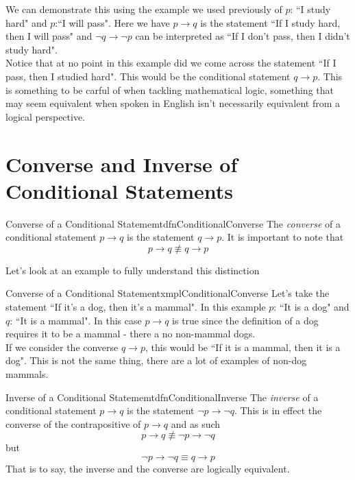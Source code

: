We can demonstrate this using the example we used previously of $p$: ``I study hard" and $p$:``I will pass". Here we have $p \to q$ is the statement ``If I study hard, then I will pass" and $\lnot q \to \lnot p$ can be interpreted as ``If I don't pass, then I didn't study hard".\\

Notice that at no point in this example did we come across the statement ``If I pass, then I studied hard". This would be the conditional statement $q \to p$. This is something to be carful of when tackling mathematical logic, something that may seem equivalent when spoken in English isn't necessarily equivalent from a logical perspective.

\section{Converse and Inverse of Conditional Statements}

\begin{dfn}[label={def:conditionalConverse}]{Converse of a Conditional Statememt}{dfnConditionalConverse}
    The \emph{converse} of a conditional statement $p \to q$ is the statement $q \to p$. It is important to note that
    $$p \to q \not \equiv q \to p$$
\end{dfn}

Let's look at an example to fully understand this distinction

\begin{exmpl}[label={exmpl:conditionalConverse}]{Converse of a Conditional Statement}{xmplConditionalConverse}
    Let's take the statement ``If it's a dog, then it's a mammal". In this example $p$: ``It is a dog" and $q$: ``It is a mammal". In this case $p \to q$ is true since the definition of a dog requires it to be a mammal - there a no non-mammal dogs.\\

    If we consider the converse $q \to p$, this would be ``If it is a mammal, then it is a dog". This is not the same thing, there are a lot of examples of non-dog mammals.
\end{exmpl}

\begin{dfn}[label={def:conditionalInverse}]{Inverse of a Conditional Statememt}{dfnConditionalInverse}
    The \emph{inverse} of a conditional statement $p \to q$ is the statement $\lnot p \to \lnot q$. This is in effect the converse of the contrapositive of $p \to q$ and as such
    $$p \to q \not \equiv \lnot p \to \lnot q$$
    but
    $$\lnot p \to \lnot q \equiv q \to p$$
    That is to say, the inverse and the converse are logically equivalent.
\end{dfn}

